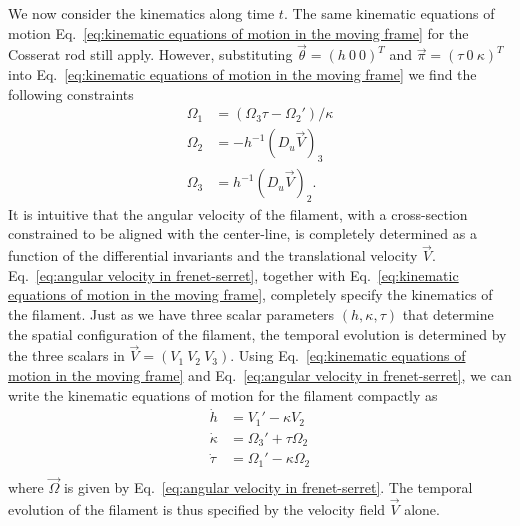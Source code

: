 We now consider the kinematics along time $t$. The same kinematic equations of motion Eq.~\ref{eq:kinematic equations of motion in the moving frame} for the Cosserat rod still apply. However, substituting $\vec{\theta} = (h\ 0\ 0)^T$ and $\vec{\pi} = (\tau\ 0\ \kappa)^T$ into Eq.~\ref{eq:kinematic equations of motion in the moving frame} we find the following constraints
\begin{subequations} \label{eq:angular velocity in frenet-serret}
\begin{align}
\Omega_1 & = (\Omega_3 \tau - \Omega_2') / \kappa \\
\Omega_2 & = - h^{-1} (D_u \vec{V})_3 \\
\Omega_3 & = h^{-1} (D_u \vec{V})_2.
\end{align}
\end{subequations}
It is intuitive that the angular velocity of the filament, with a cross-section constrained to be aligned with the center-line, is completely determined as a function of the differential invariants and the translational velocity $\vec{V}$. Eq.~\ref{eq:angular velocity in frenet-serret}, together with Eq.~\ref{eq:kinematic equations of motion in the moving frame}, completely specify the kinematics of the filament. Just as we have three scalar parameters $(h, \kappa, \tau)$ that determine the spatial configuration of the filament, the temporal evolution is determined by the three scalars in $\vec{V} = (V_1\ V_2\ V_3)$. Using Eq.~\ref{eq:kinematic equations of motion in the moving frame} and Eq.~\ref{eq:angular velocity in frenet-serret}, we can write the kinematic equations of motion for the filament compactly as
\begin{subequations} \label{eq:filament kinematic equtions of motion}
\begin{align}
\dot{h} & = V_1' - \kappa V_2 \\
\dot{\kappa} & = \Omega_3' + \tau \Omega_2 \\
\dot{\tau} & = \Omega_1' - \kappa \Omega_2 \\
\end{align}
\end{subequations}
where $\vec{\Omega}$ is given by Eq.~\ref{eq:angular velocity in frenet-serret}. The temporal evolution of the filament is thus specified by the velocity field $\vec{V}$ alone.


